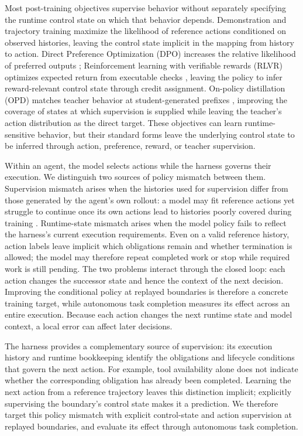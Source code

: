 \documentclass{article}
\begin{document}
Most post-training objectives supervise behavior without separately specifying the runtime control state on which that behavior depends. Demonstration and trajectory training maximize the likelihood of reference actions conditioned on observed histories, leaving the control state implicit in the mapping from history to action. Direct Preference Optimization (DPO) increases the relative likelihood of preferred outputs \citep{rafailov2023direct}; Reinforcement learning with verifiable rewards (RLVR) optimizes expected return from executable checks \citep{shao2024deepseekmath,deepseekai2025r1}, leaving the policy to infer reward-relevant control state through credit assignment. On-policy distillation (OPD) matches teacher behavior at student-generated prefixes \citep{agarwal2024onpolicy}, improving the coverage of states at which supervision is supplied while leaving the teacher's action distribution as the direct target. These objectives can learn runtime-sensitive behavior, but their standard forms leave the underlying control state to be inferred through action, preference, reward, or teacher supervision.

Within an agent, the model selects actions while the harness governs
their execution. We distinguish two sources of policy mismatch
between them. Supervision mismatch arises when the histories
used for supervision differ from those generated by the agent's own
rollout: a model may fit reference actions yet struggle to continue
once its own actions lead to histories poorly covered during training
\citep{ross2011reduction,bengio2015scheduled}.
Runtime-state mismatch arises when the model policy fails to
reflect the harness's current execution requirements. Even on a valid
reference history, action labels leave implicit which obligations
remain and whether termination is allowed; the model may therefore
repeat completed work or stop while required work is still pending. The two problems interact through the closed loop: each action changes the
successor state and hence the context of the next decision. Improving the
conditional policy at replayed boundaries is therefore a concrete training
target, while autonomous task completion measures its effect across an entire
execution. Because each action changes the next runtime state and model context,
a local error can affect later decisions. 



The harness provides a complementary source of supervision: its execution history and runtime bookkeeping identify the obligations and lifecycle conditions that govern the next action. For example, tool availability alone does not indicate whether the corresponding obligation has already been completed. Learning the next action from a reference trajectory leaves this distinction implicit; explicitly supervising the boundary's control state makes it a prediction. We therefore target this policy mismatch with explicit control-state and action supervision at replayed boundaries, and evaluate its effect through autonomous task completion.
\end{document}

